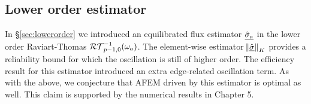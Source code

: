 \documentclass[thesis.tex]{subfiles}
\begin{document}
  \subsection{Lower order estimator}
  In \S\ref{sec:lowerorder} we introduced an equilibrated flux estimator $\underline{\hat \sigma_a}$ in the lower order Raviart-Thomas $\mathcal{RT}_{p-1,0}^{-1}(\omega_a)$. 
  The element-wise estimator $\norm{\underline{\hat \sigma}}_K$ provides a reliability bound for which the oscillation is still of higher order. The
  efficiency result for this estimator introduced an extra edge-related oscillation term. As with the above, we conjecture that AFEM driven
  by this estimator is optimal as well. This claim is supported by the numerical results in Chapter 5.
\end{document}
